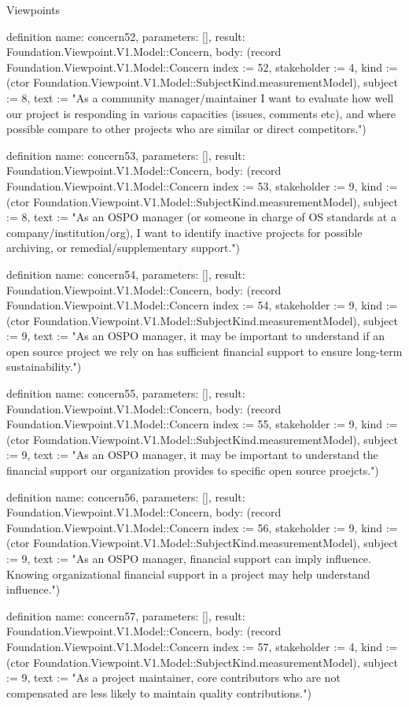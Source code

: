 \begin{lexlean}{Viewpoints}
\begin{semanticmodule}
definition{
  name: concern52,
  parameters: [],
  result: Foundation.Viewpoint.V1.Model::Concern,
  body: (record Foundation.Viewpoint.V1.Model::Concern {index := 52, stakeholder := 4, kind := (ctor Foundation.Viewpoint.V1.Model::SubjectKind.measurementModel), subject := 8, text := "As a community manager/maintainer I want to evaluate how well our project is responding in various capacities (issues, comments etc), and where possible compare to other projects who are similar or direct competitors."})
}

definition{
  name: concern53,
  parameters: [],
  result: Foundation.Viewpoint.V1.Model::Concern,
  body: (record Foundation.Viewpoint.V1.Model::Concern {index := 53, stakeholder := 9, kind := (ctor Foundation.Viewpoint.V1.Model::SubjectKind.measurementModel), subject := 8, text := "As an OSPO manager (or someone in charge of OS standards at a company/institution/org), I want to identify inactive projects for possible archiving, or remedial/supplementary support."})
}

definition{
  name: concern54,
  parameters: [],
  result: Foundation.Viewpoint.V1.Model::Concern,
  body: (record Foundation.Viewpoint.V1.Model::Concern {index := 54, stakeholder := 9, kind := (ctor Foundation.Viewpoint.V1.Model::SubjectKind.measurementModel), subject := 9, text := "As an OSPO manager, it may be important to understand if an open source project we rely on has sufficient financial support to ensure long-term sustainability."})
}

definition{
  name: concern55,
  parameters: [],
  result: Foundation.Viewpoint.V1.Model::Concern,
  body: (record Foundation.Viewpoint.V1.Model::Concern {index := 55, stakeholder := 9, kind := (ctor Foundation.Viewpoint.V1.Model::SubjectKind.measurementModel), subject := 9, text := "As an OSPO manager, it may be important to understand the financial support our organization provides to specific open source proejcts."})
}

definition{
  name: concern56,
  parameters: [],
  result: Foundation.Viewpoint.V1.Model::Concern,
  body: (record Foundation.Viewpoint.V1.Model::Concern {index := 56, stakeholder := 9, kind := (ctor Foundation.Viewpoint.V1.Model::SubjectKind.measurementModel), subject := 9, text := "As an OSPO manager, financial support can imply influence. Knowing organizational financial support in a project may help understand influence."})
}

definition{
  name: concern57,
  parameters: [],
  result: Foundation.Viewpoint.V1.Model::Concern,
  body: (record Foundation.Viewpoint.V1.Model::Concern {index := 57, stakeholder := 4, kind := (ctor Foundation.Viewpoint.V1.Model::SubjectKind.measurementModel), subject := 9, text := "As a project maintainer, core contributors who are not compensated are less likely to maintain quality contributions."})
}


\end{semanticmodule}
\end{lexlean}
